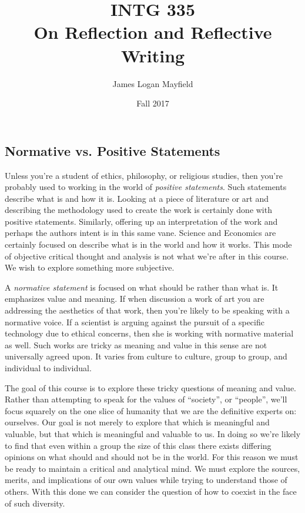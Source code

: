 \documentclass[nobib]{tufte-handout}
\title{INTG 335 \\ On Reflection and Reflective Writing}
\author{James Logan Mayfield }
\date{ Fall 2017 }
\begin{document}
\maketitle
\thispagestyle{empty}

\subsection*{Normative vs. Positive Statements}

Unless you're a student of ethics, philosophy, or religious studies, then you're probably used to working in the world of  \textit{positive statements}. Such statements describe what is and how it is.  Looking at a piece of literature or art and describing the methodology used to create the work is certainly done with positive statements. Similarly, offering up an interpretation of the work and perhaps the authors intent is in this same vane. Science and Economics are certainly focused on describe what is in the world and how it works. This mode of objective critical thought and analysis is not what we're after in this course. We wish to explore something more subjective.

A \textit{normative statement} is focused on what should be rather than what is. It emphasizes value and meaning.  If when discussion a work of art you are addressing the aesthetics of that work, then you're likely to be speaking with a normative voice. If a scientist is arguing against the pursuit of a specific technology due to ethical concerns, then she is working with normative material as well.  Such works are tricky as meaning and value in this sense are not universally agreed upon. It varies from culture to culture, group to group, and individual to individual.

The goal of this course is to explore these tricky questions of meaning and value. Rather than attempting to speak for the values of ``society'', or ``people'', we'll focus squarely on the one slice of humanity that we are the definitive experts on: ourselves. Our goal is not merely to explore that which is meaningful and valuable, but that which is meaningful and valuable to us. In doing so we're likely to find that even within a group the size of this class there exists differing opinions on what should and should not be in the world. For this reason we must be ready to maintain a critical and analytical mind. We must explore the sources, merits, and implications of our own values while trying to understand those of others. With this done we can consider the question of how to coexist in the face of such diversity.
\end{document}
